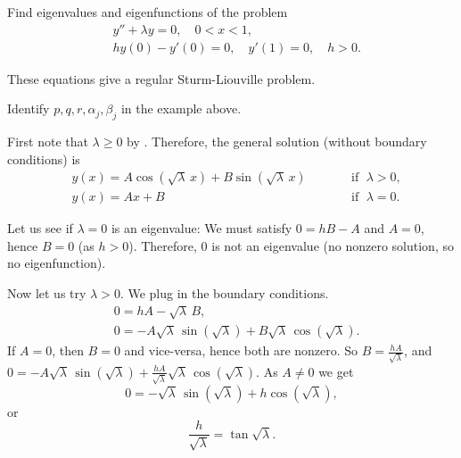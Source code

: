 \documentclass[12pt]{book}
\begin{document}
\begin{example}
Find eigenvalues and eigenfunctions of the problem
\begin{align*}
& y''+\lambda y = 0, \quad 0 < x < 1 , \\
& hy(0)- y'(0) = 0, \quad y'(1)  = 0, \quad h > 0.
\end{align*}

These equations give a regular Sturm-Liouville problem.

\begin{exercise}
Identify $p, q, r, \alpha_j, \beta_j$ in the example above.
\end{exercise}

First note that
$\lambda \geq 0$ by .
Therefore, the general solution (without boundary conditions) is
\begin{equation*}
\begin{aligned}
 & y(x) = A \cos (\! \sqrt{\lambda}\, x) + B \sin (\!
\sqrt{\lambda}\, x) & & \qquad \text{if } \; \lambda > 0 , \\
& y(x) = A x + B & & \qquad \text{if } \; \lambda = 0 .
\end{aligned}
\end{equation*}

Let us see if $\lambda = 0$ is an eigenvalue:
We must satisfy $0 = hB - A$ and $A = 0$, hence $B=0$ (as $h > 0$).
Therefore, 0 is not an eigenvalue (no nonzero solution, so no eigenfunction).

Now let us
try $\lambda > 0$.  We plug in the boundary conditions.
\begin{align*}
& 0 = h A - \sqrt{\lambda}\, B , \\
& 0 = -A \sqrt{\lambda}\, \sin (\!\sqrt{\lambda}) +B \sqrt{\lambda}\,
\cos (\!\sqrt{\lambda}) .
\end{align*}
If $A=0$, then $B=0$ and vice-versa, hence both are nonzero.
So $B = \frac{hA}{\sqrt{\lambda}}$, and
$0 = -A \sqrt{\lambda}\, \sin (\! \sqrt{\lambda}) + \frac{hA}{\sqrt{\lambda}}
\sqrt{\lambda}\, \cos (\! \sqrt{\lambda})$.  As $A \not= 0$ we get
\begin{equation*}
0 = 
- \sqrt{\lambda}\, \sin (\! \sqrt{\lambda}) + h \cos (\! \sqrt{\lambda}) ,
\end{equation*}
or
\begin{equation*}
\frac{h}{\sqrt{\lambda}} = \tan \sqrt{\lambda} .
\end{equation*}


\end{example}
\end{document}
